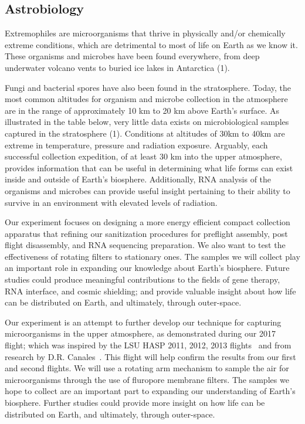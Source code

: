 \subsection{Astrobiology}
\label{sec:AstrobiologyBackground}

Extremophiles are microorganisms that thrive in physically and/or chemically extreme conditions, which are detrimental to most of life on Earth as we know it. These organisms and microbes have been found everywhere, from deep underwater volcano vents to buried ice lakes in Antarctica (1). 

Fungi and bacterial spores have also been found in the stratosphere. Today, the most common altitudes for organism and microbe collection in the atmosphere are in the range of approximately 10 km to 20 km above Earth’s surface. As illustrated in the table below, very little data exists on microbiological samples captured in the stratosphere (1). Conditions at altitudes of 30km to 40km are extreme in temperature, pressure and radiation exposure. Arguably, each successful collection expedition, of at least 30 km into the upper atmosphere, provides information that can be useful in determining what life forms can exist inside and outside of Earth’s biosphere. Additionally, RNA analysis of the organisms and microbes can provide useful insight pertaining to their ability to survive in an environment with elevated levels of radiation.  

 Our experiment focuses on designing a more energy efficient compact collection apparatus that refining our sanitization procedures for preflight assembly, post flight disassembly, and RNA sequencing preparation. We also want to test the effectiveness of rotating filters to stationary ones. The samples we will collect play an important role in expanding our knowledge about Earth’s biosphere. Future studies could produce meaningful contributions to the fields of gene therapy, RNA interface, and cosmic shielding; and provide valuable insight about how life can be distributed on Earth, and ultimately, through outer-space.


Our experiment is an attempt to further develop our technique for capturing microorganisms in the upper atmosphere, as demonstrated during our 2017~\cite{SORA1} flight; which was inspired by the LSU HASP 2011, 2012, 2013 flights~\cite{LSU} and from research by D.R. Canales~\cite{Canales}.  This flight will help confirm the results from our first and second flights.  We will use a rotating arm mechanism to sample the air for microorganisms through the use of fluropore membrane filters. The samples we hope to collect are an important part to expanding our understanding of Earth's biosphere. Further studies could provide more insight on how life can be distributed on Earth, and ultimately, through outer-space.

